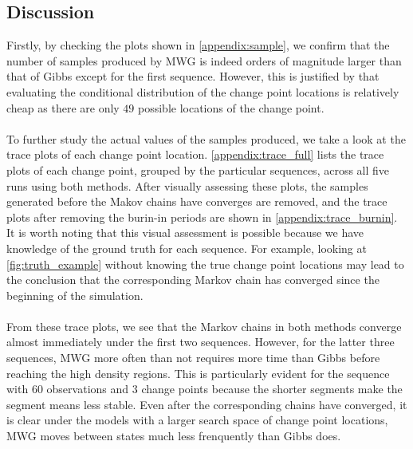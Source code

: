 \subsection{Discussion}
Firstly, by checking the plots shown in \cref{appendix:sample}, we confirm that the number of samples produced by MWG is indeed orders of magnitude larger than that of Gibbs except for the first sequence. However, this is justified by that evaluating the conditional distribution of the change point locations is relatively cheap as there are only $49$ possible locations of the change point.\\\\
To further study the actual values of the samples produced, we take a look at the trace plots of each change point location. \cref{appendix:trace_full} lists the trace plots of each change point, grouped by the particular sequences, across all five runs using both methods. After visually assessing these plots, the samples generated before the Makov chains have converges are removed, and the trace plots after removing the burin-in periods are shown in \cref{appendix:trace_burnin}. It is worth noting that this visual assessment is possible because we have knowledge of the ground truth for each sequence. For example, looking at \cref{fig:truth_example} without knowing the true change point locations may lead to the conclusion that the corresponding Markov chain has converged since the beginning of the simulation.\\\\
From these trace plots, we see that the Markov chains in both methods converge almost immediately under the first two sequences. However, for the latter three sequences, MWG more often than not requires more time than Gibbs before reaching the high density regions. This is particularly evident for the sequence with $60$ observations and $3$ change points because the shorter segments make the segment means less stable. Even after the corresponding chains have converged, it is clear under the models with a larger search space of change point locations, MWG moves between states much less frenquently than Gibbs does.\\\\
